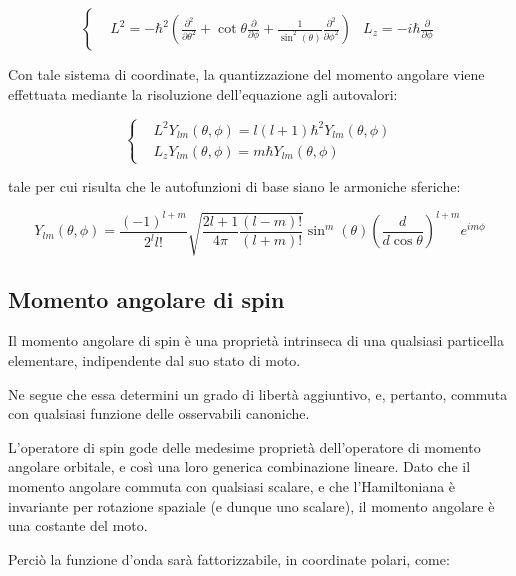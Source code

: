 \documentclass{article}
\begin{document}
\begin{equation}
    \left\{
    \begin{aligned}
         & L^2=-\hbar^2\left(\frac{\partial^2}{\partial \theta^2}+\cot{\theta}\frac{\partial}{\partial \phi}+\frac{1}{\sin^2(\theta)}\frac{\partial^2}{\partial \phi^2}\right)
         & L_z=-i\hbar\frac{\partial}{\partial \phi}
    \end{aligned}
    \right.
\end{equation}

Con tale sistema di coordinate, la quantizzazione del momento angolare viene effettuata mediante la risoluzione dell'equazione agli autovalori:

\begin{equation}
    \left\{
    \begin{aligned}
         & L^2Y_{lm}(\theta, \phi)=l(l+1)\hbar^2Y_{lm}(\theta, \phi) \\
         & L_zY_{lm}(\theta, \phi)=m\hbar Y_{lm}(\theta, \phi)
    \end{aligned}
    \right.
\end{equation}

tale per cui risulta che le autofunzioni di base siano le armoniche sferiche:

\begin{equation}
    Y_{lm}(\theta, \phi) = \frac{(-1)^{l+m}}{2^l l!} \sqrt{\frac{2l+1}{4\pi} \frac{(l-m)!}{(l+m)!}} \sin^m(\theta) \left( \frac{d}{d\cos{\theta}} \right)^{l+m} e^{im\phi}
\end{equation}

\subsection{Momento angolare di spin}
Il momento angolare di spin è una proprietà intrinseca di una qualsiasi particella elementare, indipendente dal suo stato di moto.

Ne segue che essa determini un grado di libertà aggiuntivo, e, pertanto, commuta con qualsiasi funzione delle osservabili canoniche.

L'operatore di spin gode delle medesime proprietà dell'operatore di momento angolare orbitale, e così una loro generica combinazione lineare.
Dato che il momento angolare commuta con qualsiasi scalare, e che l'Hamiltoniana è invariante per rotazione spaziale (e dunque uno scalare), il momento angolare è una costante del moto.

Perciò la funzione d'onda sarà fattorizzabile, in coordinate polari, come:
\end{document}
